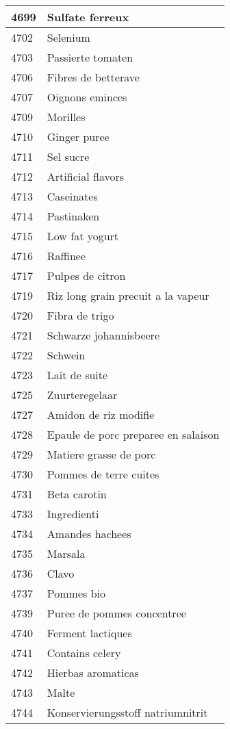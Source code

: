 \begin{longtable}{|l|l|}
4699 & Sulfate ferreux \\ \hline 
4702 & Selenium \\ \hline 
4703 & Passierte tomaten \\ \hline 
4706 & Fibres de betterave \\ \hline 
4707 & Oignons eminces \\ \hline 
4709 & Morilles \\ \hline 
4710 & Ginger puree \\ \hline 
4711 & Sel sucre \\ \hline 
4712 & Artificial flavors \\ \hline 
4713 & Caseinates \\ \hline 
4714 & Pastinaken \\ \hline 
4715 & Low fat yogurt \\ \hline 
4716 & Raffinee \\ \hline 
4717 & Pulpes de citron \\ \hline 
4719 & Riz long grain precuit a la vapeur \\ \hline 
4720 & Fibra de trigo \\ \hline 
4721 & Schwarze johannisbeere \\ \hline 
4722 & Schwein \\ \hline 
4723 & Lait de suite \\ \hline 
4725 & Zuurteregelaar \\ \hline 
4727 & Amidon de riz modifie \\ \hline 
4728 & Epaule de porc preparee en salaison \\ \hline 
4729 & Matiere grasse de porc \\ \hline 
4730 & Pommes de terre cuites \\ \hline 
4731 & Beta carotin \\ \hline 
4733 & Ingredienti \\ \hline 
4734 & Amandes hachees \\ \hline 
4735 & Marsala \\ \hline 
4736 & Clavo \\ \hline 
4737 & Pommes bio \\ \hline 
4739 & Puree de pommes concentree \\ \hline 
4740 & Ferment lactiques \\ \hline 
4741 & Contains celery \\ \hline 
4742 & Hierbas aromaticas \\ \hline 
4743 & Malte \\ \hline 
4744 & Konservierungsstoff natriumnitrit \\ \hline 

\end{longtable}
